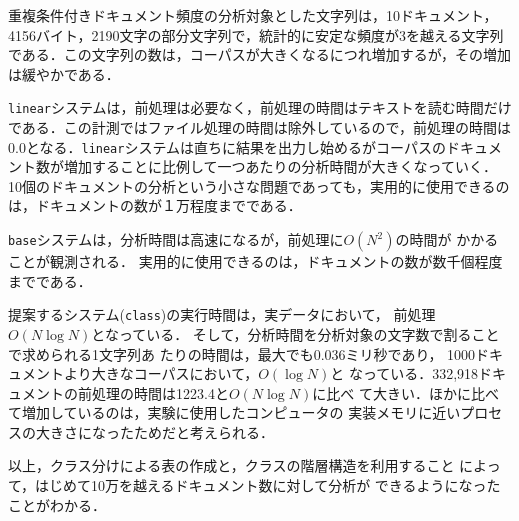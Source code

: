 重複条件付きドキュメント頻度の分析対象とした文字列は，10ドキュメント，
4156バイト，2190文字の部分文字列で，統計的に安定な頻度が3を越える文字列
である．この文字列の数は，コーパスが大きくなるにつれ増加するが，その増加
は緩やかである．

{\tt linear}システムは，前処理は必要なく，前処理の時間はテキストを読む時間だけ
である．この計測ではファイル処理の時間は除外しているので，前処理の時間は
0.0となる．{\tt linear}システムは直ちに結果を出力し始めるがコーパスのドキュメ
ント数が増加することに比例して一つあたりの分析時間が大きくなっていく．
10個のドキュメントの分析という小さな問題であっても，実用的に使用できるの
は，ドキュメントの数が１万程度までである．

{\tt base}システムは，分析時間は高速になるが，前処理に$O(N^2)$の時間が
かかることが観測される．
実用的に使用できるのは，ドキュメントの数が数千個程度までである．

提案するシステム({\tt class})の実行時間は，実データにおいて，
前処理$O(N \log N)$となっている．
そして，分析時間を分析対象の文字数で割ることで求められる1文字列あ
たりの時間は，最大でも0.036ミリ秒であり，
1000ドキュメントより大きなコーパスにおいて，$O(\log N)$と
なっている．332,918ドキュメントの前処理の時間は1223.4と$O(N\log N)$に比べ
て大きい．ほかに比べて増加しているのは，実験に使用したコンピュータの
実装メモリに近いプロセスの大きさになったためだと考えられる．

以上，クラス分けによる表の作成と，クラスの階層構造を利用すること
によって，はじめて10万を越えるドキュメント数に対して分析が
できるようになったことがわかる．


